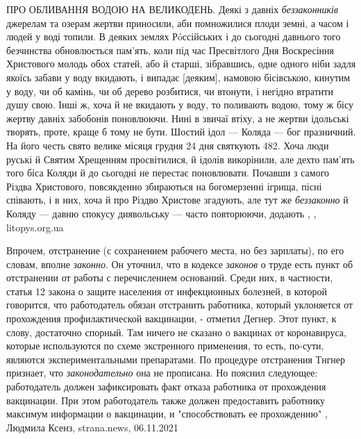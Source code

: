 ПРО ОБЛИВАННЯ ВОДОЮ НА ВЕЛИКОДЕНЬ. Деякі з давніх \emph{беззаконників} джерелам
та озерам жертви приносили, аби помножилися плоди земні, а часом і людей у воді
топили. В деяких землях Рóссійських і до сьогодні давнього того безчинства
обновлюється пам’ять, коли під час Пресвітлого Дня Воскресіння Христового
молодь обох статей, або й старші, зібравшись, одне одного ніби задля якоїсь
забави у воду вкидають, і випадає [деяким], намовою бісівською, кинутим у воду,
чи об камінь, чи об дерево розбитися, чи втонути, і негідно втратити душу свою.
Інші ж, хоча й не вкидають у воду, то поливають водою, тому ж бісу жертву
давніх забобонів поновлюючи. Нині в звичаї втіху, а не жертви ідольські
творять, проте, краще б тому не бути.  Шостий ідол — Коляда — бог празничний.
На його честь свято велике місяця грудня 24 дня святкують 482. Хоча люди руські
й Святим Хрещенням просвітилися, й ідолів викорінили, але дехто пам’ять того
біса Коляди й до сьогодні не перестає поновлювати. Почавши з самого Різдва
Христового, повсякденно збираються на богомерзенні ігрища, пісні співають, і в
них, хоча й про Різдво Христове згадують, але тут же \emph{беззаконно} й Коляду
— давню спокусу диявольську — часто повторюючи, додають
, , litopys.org.ua 

Впрочем, отстранение (с сохранением рабочего места, но без зарплаты), по его
словам, вполне \emph{законно}. Он уточнил, что в кодексе \emph{законов} о
труде есть пункт об отстранении от работы с перечислением оснований. Среди них,
в частности, статья 12 закона о защите населения от инфекционных болезней, в
которой говорится, что работодатель обязан отстранить работника, который
уклоняется от прохождения профилактической вакцинации, - отметил Дегнер. Этот
пункт, к слову, достаточно спорный. Там ничего не сказано о вакцинах от
коронавируса, которые используются по схеме экстренного применения, то есть,
по-сути, являются экспериментальными препаратами.  По процедуре отстранения
Тнгнер признает, что \emph{законодательно} она не прописана.  Но пояснил
следующее: работодатель должен зафиксировать факт отказа работника от
прохождения вакцинации. При этом работодатель также должен предоставить
работнику максимум информации о вакцинации, и "способствовать ее прохождению"
, 
Людмила Ксенз, strana.news, 06.11.2021
